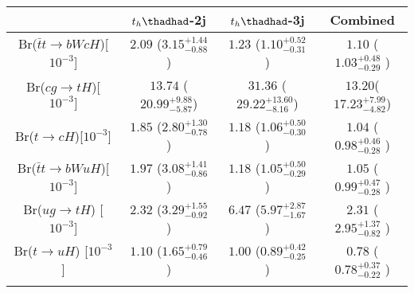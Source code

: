 %

\centering
\begin{tabular}{cccc} \toprule\toprule
 & $t_h\thadhad$-2j & $t_h\thadhad$-3j & Combined\\\midrule

Br($\bar{t}t\to bWcH$)[$10^{-3}$] & $2.09$  ($3.15^{+1.44}_{-0.88}$ ) & $1.23$  ($1.10^{+0.52}_{-0.31}$  )  & $1.10$ ($1.03^{+0.48}_{-0.29}$ )\\
Br($cg\to tH$)[$10^{-3}]$         & $13.74$ ($20.99^{+9.88}_{-5.87}$) & $31.36$ ($29.22^{+13.60}_{-8.16}$)  & $13.20$($17.23^{+7.99}_{-4.82}$)\\
Br($t\to cH$)[$10^{-3}$]          & $1.85$  ($2.80^{+1.30}_{-0.78}$ ) & $1.18$  ($1.06^{+0.50}_{-0.30}$  )  & $1.04$ ($0.98^{+0.46}_{-0.28}$ )\\
Br($\bar{t}t\to bWuH$)[$10^{-3}$] & $1.97$  ($3.08^{+1.41}_{-0.86}$ ) & $1.18$  ($1.05^{+0.50}_{-0.29}$  )  & $1.05$ ($0.99^{+0.47}_{-0.28}$ )\\
Br($ug\to tH$) [$10^{-3}$]        & $2.32$  ($3.29^{+1.55}_{-0.92}$ ) & $6.47$  ($5.97^{+2.87}_{-1.67}$  )  & $2.31$ ($2.95^{+1.37}_{-0.82}$ )\\
Br($t\to uH$)  [$10^{-3}$]        & $1.10$  ($1.65^{+0.79}_{-0.46}$ ) & $1.00$  ($0.89^{+0.42}_{-0.25}$  )  & $0.78$ ($0.78^{+0.37}_{-0.22}$ )\\
\bottomrule\bottomrule\\
\end{tabular}




